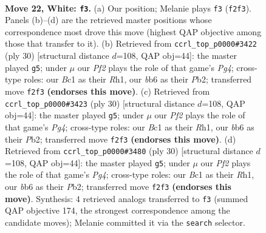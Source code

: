 \documentclass[11pt]{article}
\begin{document}
\clearpage

\begin{figure}[p]\centering
\begin{subfigure}{0.46\textwidth}\centering
\resizebox{\linewidth}{!}{%
\newchessgame
\chessboard[
  setfen={r1b3k1/pppp1pp1/1b1n1q1p/3P4/6B1/2N4P/PPP2PP1/R1B1QK2 w - - 6 22},
  showmover=false,
  pgfstyle=straightmove, color=movearrow, markmove={f2-f3}
]}
\caption{}
\end{subfigure}\hfill
\begin{subfigure}{0.46\textwidth}\centering
\resizebox{\linewidth}{!}{%
\newchessgame
\chessboard[
  setfen={r1b3k1/2q1bppp/p1p2n2/1p2p3/4P1PP/2N1BP1B/PPP2Q2/2K4R w - - 2 16},
  showmover=false,
  pgfstyle=straightmove, color=movearrow, markmove={g4-g5}
]}
\caption{}
\end{subfigure}
\\[4pt]
\begin{subfigure}{0.46\textwidth}\centering
\resizebox{\linewidth}{!}{%
\newchessgame
\chessboard[
  setfen={r1b3k1/2q1bppp/p1p2n2/1p2p3/4P1PP/2N1BP1B/PPP2Q2/2K4R w - - 2 16},
  showmover=false,
  pgfstyle=straightmove, color=movearrow, markmove={g4-g5}
]}
\caption{}
\end{subfigure}\hfill
\begin{subfigure}{0.46\textwidth}\centering
\resizebox{\linewidth}{!}{%
\newchessgame
\chessboard[
  setfen={r1b3k1/2q1bppp/p1p2n2/1p2p3/4P1PP/2N1BP1B/PPP2Q2/2K4R w - - 2 16},
  showmover=false,
  pgfstyle=straightmove, color=movearrow, markmove={g4-g5}
]}
\caption{}
\end{subfigure}
\caption{\textbf{Move 22, White: \texttt{f3}.} (a) Our position; Melanie plays \texttt{f3} (\texttt{f2f3}). Panels (b)--(d) are the retrieved master positions whose correspondence most drove this move (highest QAP objective among those that transfer to it). (b) Retrieved from \texttt{ccrl\_top\_p0000\#3422} (ply 30) [structural distance $d$=108, QAP obj=44]: the master played \texttt{g5}; under $\mu$ our \emph{Pf2} plays the role of that game's \emph{Pg4}; cross-type roles: our \emph{B}c1 as their \emph{R}h1, our \emph{b}b6 as their \emph{P}b2; transferred move \texttt{f2f3} \textbf{(endorses this move)}. (c) Retrieved from \texttt{ccrl\_top\_p0000\#3423} (ply 30) [structural distance $d$=108, QAP obj=44]: the master played \texttt{g5}; under $\mu$ our \emph{Pf2} plays the role of that game's \emph{Pg4}; cross-type roles: our \emph{B}c1 as their \emph{R}h1, our \emph{b}b6 as their \emph{P}b2; transferred move \texttt{f2f3} \textbf{(endorses this move)}. (d) Retrieved from \texttt{ccrl\_top\_p0000\#3480} (ply 30) [structural distance $d$=108, QAP obj=44]: the master played \texttt{g5}; under $\mu$ our \emph{Pf2} plays the role of that game's \emph{Pg4}; cross-type roles: our \emph{B}c1 as their \emph{R}h1, our \emph{b}b6 as their \emph{P}b2; transferred move \texttt{f2f3} \textbf{(endorses this move)}. Synthesis: 4 retrieved analogs transferred to \texttt{f3} (summed QAP objective 174, the strongest correspondence among the candidate moves); Melanie committed it via the \texttt{search} selector.}
\label{fig:thought-m42}
\end{figure}
\end{document}
